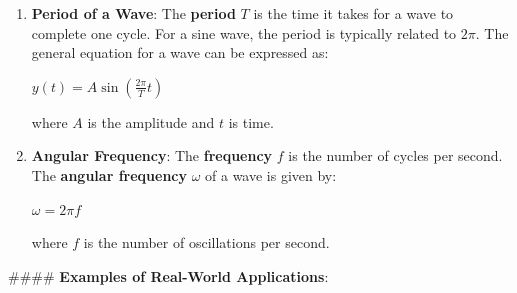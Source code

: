 \documentclass[12pt]{article}
\begin{document}
\begin{enumerate}
    \item \textbf{Period of a Wave}: The \textbf{period} $T$ is the time it takes for a wave to complete one cycle. For a sine wave, the period is typically related to $2\pi$. The general equation for a wave can be expressed as:
    \begin{center}
    $y(t) = A\sin\left(\frac{2\pi}{T}t\right)$
    \end{center}
    where $A$ is the amplitude and $t$ is time.
    \item \textbf{Angular Frequency}:
    The \textbf{frequency} $f$ is the number of cycles per second. The \textbf{angular frequency} $\omega$ of a wave is given by:
    \begin{center}
    $\omega = 2\pi f$
    \end{center}
    where $f$ is the number of oscillations per second.  
\end{enumerate}
#### \textbf{Examples of Real-World Applications}:
\end{document}
